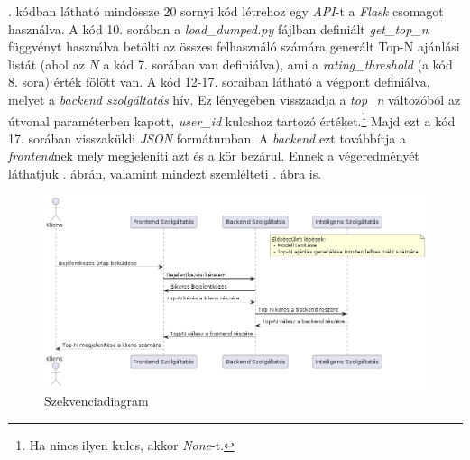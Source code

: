 \documentclass[
]{thesis-ekf}
\theoremstyle{definition}
\theoremstyle{remark}
\begin{document}
. kódban látható mindössze 20 sornyi kód létrehoz egy \emph{API}-t a \emph{Flask} csomagot használva. A kód 10. sorában a \emph{load\_dumped.py} fájlban definiált \emph{get\_top\_n} függvényt használva betölti az összes felhasználó számára generált Top-N ajánlási listát (ahol az $N$ a kód 7. sorában van definiálva), ami a \emph{rating\_threshold} (a kód 8. sora) érték fölött van. A kód 12-17. soraiban látható a végpont definiálva, melyet a \emph{backend szolgáltatás} hív. Ez lényegében visszaadja a \emph{top\_n} változóból az útvonal paraméterben kapott, \emph{user\_id} kulcshoz tartozó értéket.\footnote{Ha nincs ilyen kulcs, akkor \emph{None}-t.} Majd ezt a kód 17. sorában visszaküldi \emph{JSON} formátumban. A \emph{backend} ezt továbbítja a \emph{frontend}nek mely megjeleníti azt és a kör bezárul. Ennek a végeredményét láthatjuk . ábrán, valamint mindezt szemlélteti . ábra is.

\begin{figure}[H]
	\centering
	\includegraphics[width=14cm]{images/sequence-diagram-hu.png}
	\caption[Szekvenciadiagram]{Szekvenciadiagram}
	\label{fig-sequence-diagram-hu}
\end{figure}
\end{document}
